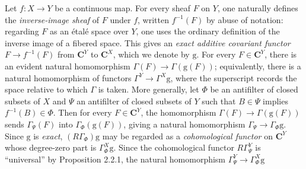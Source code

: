 Let $f:X\to Y$ be a continuous map. For every sheaf $F$ on $Y$,
one naturally defines the \textit{inverse-image sheaf} of $F$ under $f$,
written $f^{-1}(F)$ by abuse of notation: regarding $F$ as an étalé space
over $Y$, one uses the ordinary definition of the inverse image of a fibered
space. This gives an \textit{exact additive covariant functor}
$F\to f^{-1}(F)$ from $\mathbf C^Y$ to $\mathbf C^X$, which we denote by $\mathrm{g}$. For
every $F\in \mathbf C^Y$, there is an evident natural homomorphism
$\Gamma(F)\to\Gamma(\mathrm{g}(F))$; equivalently, there is a natural
homomorphism of functors $\Gamma^Y\to\Gamma^X\mathrm{g}$, where the
superscript records the space relative to which $\Gamma$ is taken.
More generally, let $\Phi$ be an antifilter of closed subsets of $X$ and
$\Psi$ an antifilter of closed subsets of $Y$ such that $B\in\Psi$ implies
$f^{-1}(B)\in\Phi$. Then for every $F\in \mathbf C^Y$, the homomorphism
$\Gamma(F)\to\Gamma(\mathrm{g}(F))$ sends $\Gamma_\Psi(F)$ into
$\Gamma_\Phi(\mathrm{g}(F))$, giving a natural homomorphism
$\Gamma_\Psi\to\Gamma_\Phi \mathrm{g}$. Since $\mathrm{g}$ is \textit{exact},
$(R\Gamma_\Phi)\mathrm{g}$ may be regarded as a \textit{cohomological functor} on $\mathbf C^Y$ whose
degree-zero part is $\Gamma^X_\Phi \mathrm{g}$. Since the cohomological functor
$R\Gamma^Y_\Psi$ is ``universal'' by Proposition 2.2.1, the natural
homomorphism $\Gamma^Y_\Psi\to\Gamma^X_\Phi \mathrm{g}$


